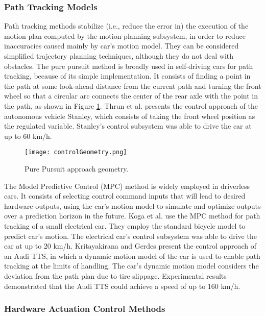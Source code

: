 \subsubsection{Path Tracking Models}

Path tracking methods stabilize (i.e., reduce the error in) the execution of the
motion plan computed by the motion planning subsystem, in order to reduce
inaccuracies caused mainly by car’s motion model. They can be considered
simplified trajectory planning techniques, although they do not deal with
obstacles. The pure pursuit method is broadly used in self-driving cars for path
tracking, because of its simple implementation. It consists of finding a point
in the path at some look-ahead distance from the current path and turning the
front wheel so that a circular arc connects the center of the rear axle with the
point in the path, as shown in Figure \ref{fig:controlGeometry}. Thrun et al.
\cite{THR07} presents the control approach of the autonomous vehicle Stanley,
which consists of taking the front wheel position as the regulated variable.
Stanley’s control subsystem was able to drive the car at up to 60 km/h.

\begin{figure}[H]
    \centering
    \texttt{[image: controlGeometry.png]}
    \caption{Pure Pursuit approach geometry.}
    \label{fig:controlGeometry}
\end{figure}

The Model Predictive Control (MPC) method is widely employed in driverless cars.
It consists of selecting control command inputs that will lead to desired
hardware outputs, using the car’s motion model to simulate and optimize outputs
over a prediction horizon in the future. Koga et al. \cite{KOG13} use the MPC
method for path tracking of a small electrical car. They employ the standard
bicycle model to predict car’s motion. The electrical car’s control subsystem
was able to drive the car at up to 20 km/h. Kritayakirana and Gerdes \cite{KRI12}
present the control approach of an Audi TTS, in which a dynamic motion model of
the car is used to enable path tracking at the limits of
handling. The car’s dynamic motion model considers the deviation from the path
plan due to tire slippage. Experimental results demonstrated that the Audi TTS
could achieve a speed of up to 160 km/h.

\subsubsection{Hardware Actuation Control Methods}

